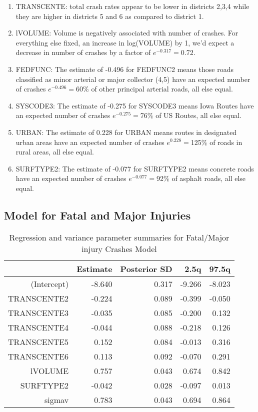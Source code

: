 \documentclass[a4paper]{article}\usepackage[]{graphicx}\usepackage[]{color}
\begin{document}
\begin{enumerate}
\item
TRANSCENTE: total crash rates appear to be lower in districts 2,3,4 while they are higher in districts 5 and 6 as compared to district 1. 

\item
lVOLUME: Volume is negatively associated with number of crashes. For everything else fixed, an increase in log(VOLUME) by 1, we'd expect a decrease in number of crashes by a factor of $e^{-0.317}=$0.72.

\item
FEDFUNC: The estimate of -0.496 for FEDFUNC2 means those roads classified as minor arterial or major collector (4,5) have an expected number of crashes $e^{-0.496}=$60\% of other principal arterial roads, all else equal. 

\item
SYSCODE3: The estimate of -0.275 for SYSCODE3 means Iowa Routes have an expected number of crashes $e^{-0.275}=$76\% of US Routes, all else equal.

\item
URBAN: The estimate of 0.228 for URBAN means routes in designated urban areas have an expected number of crashes $e^{0.228}=$125\% of roads in rural areas, all else equal.

\item
SURFTYPE2: The estimate of -0.077 for SURFTYPE2 means concrete roads have an expected number of crashes $e^{-0.077}=$92\% of asphalt roads, all else equal.

\end{enumerate}

\clearpage
\subsection{Model for Fatal and Major Injuries}


\begin{table}[ht]
\centering
\begin{tabular}{rrrrr}
  \hline
 & Estimate & Posterior SD & 2.5q & 97.5q \\ 
  \hline
(Intercept) & -8.640 & 0.317 & -9.266 & -8.023 \\ 
  TRANSCENTE2 & -0.224 & 0.089 & -0.399 & -0.050 \\ 
  TRANSCENTE3 & -0.035 & 0.085 & -0.200 & 0.132 \\ 
  TRANSCENTE4 & -0.044 & 0.088 & -0.218 & 0.126 \\ 
  TRANSCENTE5 & 0.152 & 0.084 & -0.013 & 0.316 \\ 
  TRANSCENTE6 & 0.113 & 0.092 & -0.070 & 0.291 \\ 
  lVOLUME & 0.757 & 0.043 & 0.674 & 0.842 \\ 
  SURFTYPE2 & -0.042 & 0.028 & -0.097 & 0.013 \\ 
  sigmav & 0.783 & 0.043 & 0.694 & 0.864 \\ 
   \hline
\end{tabular}
\caption{Regression and variance parameter summaries for Fatal/Major injury Crashes Model} 
\label{fatmajcrash}
\end{table}
\end{document}
